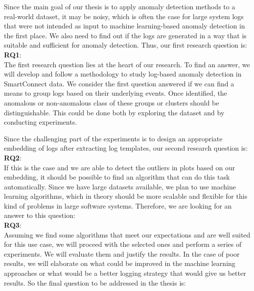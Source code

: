Since the main goal of our thesis is to apply anomaly detection methods to a real-world dataset, it may be noisy, which is often the case for large system logs that were not intended as input to machine learning-based anomaly detection in the first place. 
We also need to find out if the logs are generated in a way that is suitable and sufficient for anomaly detection. Thus, our first research question is:\\

\textbf{RQ1}: \textit{\RQFirst}\\
    
The first research question lies at the heart of our research. To find an answer, we will develop and follow a methodology to study log-based anomaly detection in SmartConnect data. We consider the first question answered if we can find a means to group logs based on their underlying events. Once identified, the anomalous or non-anomalous class of these groups or clusters should be distinguishable. This could be done both by exploring the dataset and by conducting experiments.

Since the challenging part of the experiments is to design an appropriate embedding of logs after extracting log templates, our second research question is:\\ 


\textbf{RQ2}: \textit{\RQSecond}\\

If this is the case and we are able to detect the outliers in plots based on our embedding, it should be possible to find an algorithm that can do this task automatically. Since we have large datasets available, we plan to use machine learning algorithms, which in theory should be more scalable and flexible for this kind of problems in large software systems.
Therefore, we are looking for an answer to this question:\\


\textbf{RQ3}: \textit{\RQThird}\\
    
Assuming we find some algorithms that meet our expectations and are well suited for this use case, we will proceed with the selected ones and perform a series of experiments.
We will evaluate them and justify the results. In the case of poor results, we will elaborate on what could be improved in the machine learning approaches or what would be a better logging strategy that would give us better results.
So the final question to be addressed in the thesis is:\\

